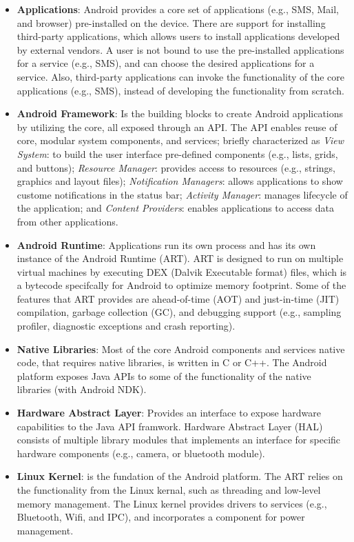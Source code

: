 \begin{itemize}
    \item \textbf{Applications}: Android provides a core set of applications (e.g., SMS, Mail, and browser) pre-installed on the device. There are support for installing third-party applications, which allows users to install applications developed by external vendors. A user is not bound to use the pre-installed applications for a service (e.g., SMS), and can choose the desired applications for a service. Also, third-party applications can invoke the functionality of the core applications (e.g., SMS), instead of developing the functionality from scratch. 
    \item \textbf{Android Framework}: Is the building blocks to create Android applications by utilizing the core, all exposed through an API. The API enables reuse of core, modular system components, and services; briefly characterized as \textit{View System}: to build the user interface pre-defined components (e.g., lists, grids, and buttons); \textit{Resource Manager}: provides access to resources (e.g., strings, graphics and layout files); \textit{Notification Managers}: allows applications to show custome notifications in the status bar; \textit{Activity Manager}: manages lifecycle of the application; and \textit{Content Providers}: enables applications to access data from other applications.
    \item \textbf{Android Runtime}: Applications run its own process and has its own instance of the Android Runtime (ART). ART is designed to run on multiple virtual machines by executing DEX (Dalvik Executable format) files, which is a bytecode specifcally for Android to optimize memory footprint. Some of the features that ART provides are ahead-of-time (AOT) and just-in-time (JIT) compilation, garbage collection (GC), and debugging support (e.g., sampling profiler, diagnostic exceptions and crash reporting).
    \item \textbf{Native Libraries}: Most of the core Android components and services native code, that requires native libraries, is written in C or C++. The Android platform exposes Java APIs to some of the functionality of the native libraries (with Android NDK).   
    \item \textbf{Hardware Abstract Layer}: Provides an interface to expose hardware capabilities to the Java API framwork. Hardware Abstract Layer (HAL) consists of multiple library modules that implements an interface for specific hardware components (e.g., camera, or bluetooth module).
    \item \textbf{Linux Kernel}: is the fundation of the Android platform. The ART relies on the functionality from the Linux kernal, such as threading and low-level memory management. The Linux kernel provides drivers to services (e.g., Bluetooth, Wifi, and IPC), and incorporates a component for power management. 
\end{itemize} 


